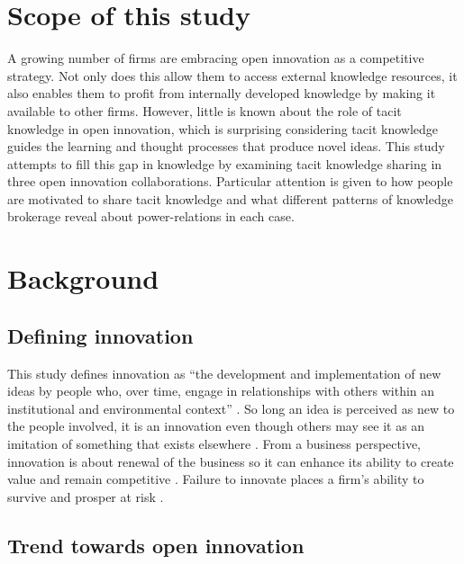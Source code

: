 
\section{Scope of this study}

A growing number of firms are embracing open innovation as a competitive strategy. Not only does this allow them to access external knowledge resources, it also enables them to profit from internally developed knowledge by making it available to other firms. However, little is known about the role of tacit knowledge in open innovation, which is surprising considering tacit knowledge guides the learning and thought processes that produce novel ideas. This study attempts to fill this gap in knowledge by examining tacit knowledge sharing in three open innovation collaborations. Particular attention is given to how people are motivated to share tacit knowledge and what different patterns of knowledge brokerage reveal about power-relations in each case. \medskip

\section{Background}

\subsection{Defining innovation}

This study defines innovation as \enquote{the development and implementation of new ideas by people who, over time, engage in relationships with others within an institutional and environmental context} \citep{van1986central}. So long an idea is perceived as new to the people involved, it is an innovation even though others may see it as an imitation of something that exists elsewhere \citep{van1986central}. From a business perspective, innovation is about renewal of the business so it can enhance its ability to create value and remain competitive \citep{schumpeter1950capitalism}. Failure to innovate places a firm's ability to survive and prosper at risk \citep{bessant2005managing}. \medskip 

\subsection{Trend towards open innovation}

